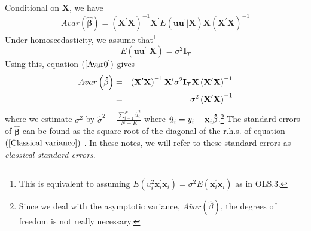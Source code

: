 \documentclass{article}
\begin{document}
Conditional on $\mathbf{X}$, we have%
\begin{equation}
Avar\left( \mathbf{\hat{\beta}}\right) =\left( \mathbf{X}^{\prime }\mathbf{X}%
\right) ^{-1}\mathbf{X}^{\prime }E\left( \mathbf{uu}^{\prime }|\mathbf{X}%
\right) \mathbf{X}\left( \mathbf{X}^{\prime }\mathbf{X}\right) ^{-1}
\label{Avar0}
\end{equation}%
Under homoscedasticity, we assume that\footnote{%
This is equivalent to assuming $E\left( u_{i}^{2}\mathbf{x}_{i}^{\prime }%
\mathbf{x}_{i}\right) =\sigma ^{2}E\left( \mathbf{x}_{i}^{\prime }\mathbf{x}%
_{i}\right) $ as in OLS.3.}%
\begin{equation}
E\left( \mathbf{uu}^{\prime }|\mathbf{X}\right) =\sigma ^{2}\mathbf{I}_{T}
\label{Omega homoscedastic}
\end{equation}%
Using this, equation $\left( \ref{Avar0}\right) $ gives%
\begin{eqnarray}
Avar\left( \mathbf{\hat{\beta}}\right) &=&\left( \mathbf{X}^{\prime }\mathbf{%
X}\right) ^{-1}\mathbf{X}^{\prime }\sigma ^{2}\mathbf{I}_{T}\mathbf{X}\left( 
\mathbf{X}^{\prime }\mathbf{X}\right) ^{-1}  \notag \\
&=&\sigma ^{2}\left( \mathbf{X}^{\prime }\mathbf{X}\right) ^{-1}
\label{Classical variance}
\end{eqnarray}%
where we estimate $\sigma ^{2}$ by $\hat{\sigma}^{2}=\frac{\sum_{i=1}^{N}%
\hat{u}_{i}^{2}}{N-K}$ where $\hat{u}_{i}=y_{i}-\mathbf{x}_{i}\mathbf{\hat{%
\beta}}$.\footnote{%
Since we deal with the asymptotic variance, $A\hat{v}ar\left( \hat{\beta}%
\right) $, the degrees of freedom is not really necessary.} The standard
errors of $\mathbf{\hat{\beta}}$ can be found as the square root of the
diagonal of the r.h.s. of equation $\left( \ref{Classical variance}\right) $%
. In these notes, we will refer to these standard errors as \emph{classical
standard errors}.
\end{document}
